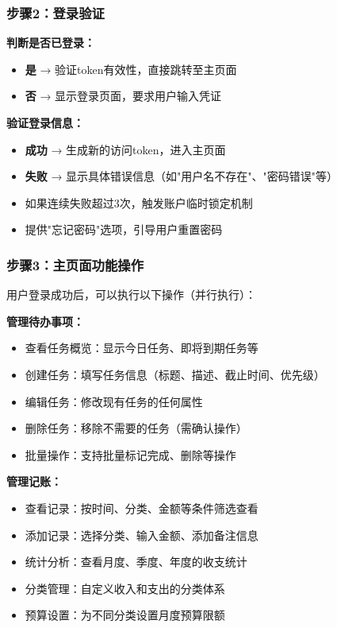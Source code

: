 \documentclass[a4paper]{article}
\begin{document}
\subsubsection{步骤2：登录验证}

\textbf{判断是否已登录：}

\begin{itemize}
    \item \textbf{是} → 验证token有效性，直接跳转至主页面
    \item \textbf{否} → 显示登录页面，要求用户输入凭证
\end{itemize}

\textbf{验证登录信息：}

\begin{itemize}
    \item \textbf{成功} → 生成新的访问token，进入主页面
    \item \textbf{失败} → 显示具体错误信息（如"用户名不存在"、"密码错误"等）
    \item 如果连续失败超过3次，触发账户临时锁定机制
    \item 提供"忘记密码"选项，引导用户重置密码
\end{itemize}

\subsubsection{步骤3：主页面功能操作}

用户登录成功后，可以执行以下操作（并行执行）：

\textbf{管理待办事项：}
\begin{itemize}
    \item 查看任务概览：显示今日任务、即将到期任务等
    \item 创建任务：填写任务信息（标题、描述、截止时间、优先级）
    \item 编辑任务：修改现有任务的任何属性
    \item 删除任务：移除不需要的任务（需确认操作）
    \item 批量操作：支持批量标记完成、删除等操作
\end{itemize}

\textbf{管理记账：}
\begin{itemize}
    \item 查看记录：按时间、分类、金额等条件筛选查看
    \item 添加记录：选择分类、输入金额、添加备注信息
    \item 统计分析：查看月度、季度、年度的收支统计
    \item 分类管理：自定义收入和支出的分类体系
    \item 预算设置：为不同分类设置月度预算限额
\end{itemize}
\end{document}
